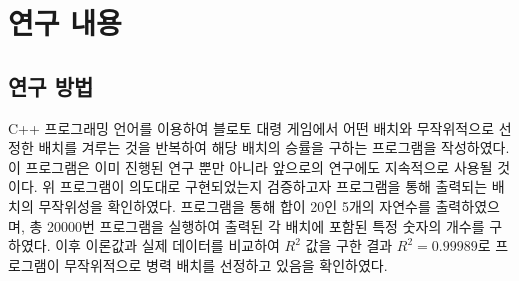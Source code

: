 \section{연구 내용}
\subsection{연구 방법}
C++ 프로그래밍 언어를 이용하여 블로토 대령 게임에서 어떤 배치와 무작위적으로 선정한 배치를 겨루는 것을 반복하여 해당 배치의 승률을 구하는 프로그램을 작성하였다. 이 프로그램은 이미 진행된 연구 뿐만 아니라 앞으로의 연구에도 지속적으로 사용될 것이다. 위 프로그램이 의도대로 구현되었는지 검증하고자 프로그램을 통해 출력되는 배치의 무작위성을 확인하였다. 프로그램을 통해 합이 20인 5개의 자연수를 출력하였으며, 총 20000번 프로그램을 실행하여 출력된 각 배치에 포함된 특정 숫자의 개수를 구하였다. 이후 이론값과 실제 데이터를 비교하여 $R^2$ 값을 구한 결과 $R^2=0.99989$로 프로그램이 무작위적으로 병력 배치를 선정하고 있음을 확인하였다.

